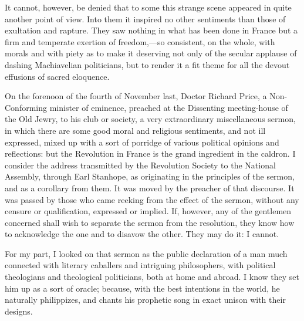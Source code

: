 It cannot, however, be denied that to some this strange scene appeared in quite another point of view. Into them it inspired no other sentiments than those of exultation and rapture. They saw nothing in what has been done in France but a firm and temperate exertion of freedom,—so consistent, on the whole, with morals and with piety as to make it deserving not only of the secular applause of dashing Machiavelian politicians, but to render it a fit theme for all the devout effusions of sacred eloquence.

On the forenoon of the fourth of November last, Doctor Richard Price, a Non-Conforming minister of eminence, preached at the Dissenting meeting-house of the Old Jewry, to his club or society, a very extraordinary miscellaneous sermon, in which there are some good moral and religious sentiments, and not ill expressed, mixed up with a sort of porridge of various political opinions and reflections: but the Revolution in France is the grand ingredient in the caldron. I consider the address transmitted by the Revolution Society to the National Assembly, through Earl Stanhope, as originating in the principles of the sermon, and as a corollary from them. It was moved by the preacher of that discourse. It was passed by those who came reeking from the effect of the sermon, without any censure or qualification, expressed or implied. If, however, any of the gentlemen concerned shall wish to separate the sermon from the resolution, they know how to acknowledge the one and to disavow the other. They may do it: I cannot.

For my part, I looked on that sermon as the public declaration of a man much connected with literary caballers and intriguing philosophers, with political theologians and theological politicians, both at home and abroad. I know they set him up as a sort of oracle; because, with the best intentions in the world, he naturally philippizes, and chants his prophetic song in exact unison with their designs.

